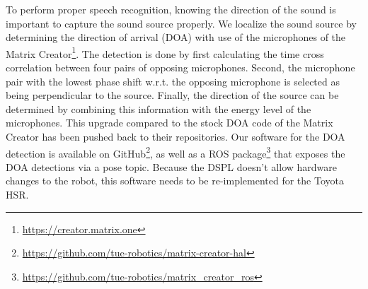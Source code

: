 To perform proper speech recognition, knowing the direction of the sound is important to capture the sound source properly. We localize the sound source by determining the direction of arrival (DOA) with use of the microphones of the Matrix Creator\footnote{\url{https://creator.matrix.one}}.
The detection is done by first calculating the time cross correlation between four pairs of opposing microphones. Second, the microphone pair with the lowest phase shift w.r.t. the opposing microphone is selected as being perpendicular to the source. Finally, the direction of the source can be determined by combining this information with the energy level of the microphones. This upgrade compared to the stock DOA code of the Matrix Creator has been pushed back to their repositories. Our software for the DOA detection is available on GitHub\footnote{\url{https://github.com/tue-robotics/matrix-creator-hal}}, as well as a ROS package\footnote{\url{https://github.com/tue-robotics/matrix_creator_ros}} that exposes the DOA detections via a pose topic.
Because the DSPL doesn't allow hardware changes to the robot, this software needs to be re-implemented for the Toyota HSR.
